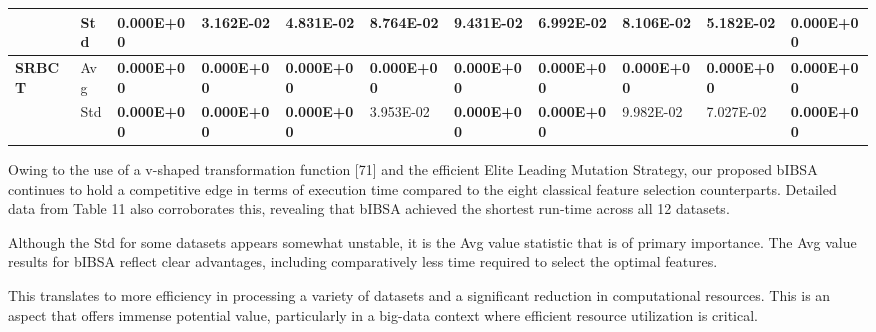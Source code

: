 \documentclass{article} %
\begin{document}
\begin{tabular}{|p{0.6in}|p{0.3in}|p{0.4in}|p{0.4in}|p{0.4in}|p{0.4in}|p{0.4in}|p{0.4in}|p{0.4in}|p{0.4in}|p{0.4in}|}
\textbf{} & Std & \textbf{0.000E+00} & 3.162E-02 & 4.831E-02 & 8.764E-02 & 9.431E-02\textbf{} & 6.992E-02 & 8.106E-02\textbf{} & 5.182E-02 & \textbf{0.000E+00} \\ \hline 
\textbf{SRBCT} & Avg & \textbf{0.000E+00} & \textbf{0.000E+00} & \textbf{0.000E+00} & \textbf{0.000E+00} & \textbf{0.000E+00} & \textbf{0.000E+00} & \textbf{0.000E+00} & \textbf{0.000E+00} & \textbf{0.000E+00} \\ \hline 
\textbf{} & Std & \textbf{0.000E+00} & \textbf{0.000E+00} & \textbf{0.000E+00} & 3.953E-02 & \textbf{0.000E+00} & \textbf{0.000E+00} & 9.982E-02\textbf{} & 7.027E-02 & \textbf{0.000E+00} \\ \hline 
\end{tabular}



Owing to the use of a v-shaped transformation function [71] and the efficient Elite Leading Mutation Strategy, our proposed bIBSA continues to hold a competitive edge in terms of execution time compared to the eight classical feature selection counterparts. Detailed data from Table 11 also corroborates this, revealing that bIBSA achieved the shortest run-time across all 12 datasets.

Although the Std for some datasets appears somewhat unstable, it is the Avg value statistic that is of primary importance. The Avg value results for bIBSA reflect clear advantages, including comparatively less time required to select the optimal features.

This translates to more efficiency in processing a variety of datasets and a significant reduction in computational resources. This is an aspect that offers immense potential value, particularly in a big-data context where efficient resource utilization is critical.
\end{document}
